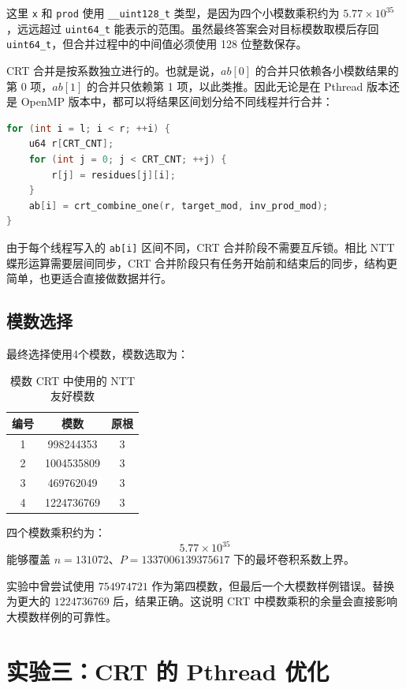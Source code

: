 \documentclass[a4paper]{article}
\begin{document}
这里 \texttt{x} 和 \texttt{prod} 使用 \texttt{\_\_uint128\_t} 类型，是因为四个小模数乘积约为 $5.77\times 10^{35}$，远远超过 \texttt{uint64\_t} 能表示的范围。虽然最终答案会对目标模数取模后存回 \texttt{uint64\_t}，但合并过程中的中间值必须使用 128 位整数保存。

CRT 合并是按系数独立进行的。也就是说，$ab[0]$ 的合并只依赖各小模数结果的第 0 项，$ab[1]$ 的合并只依赖第 1 项，以此类推。因此无论是在 Pthread 版本还是 OpenMP 版本中，都可以将结果区间划分给不同线程并行合并：

\begin{lstlisting}[title=按输出系数并行进行 CRT 合并,frame=trbl,language={C++}]
for (int i = l; i < r; ++i) {
    u64 r[CRT_CNT];
    for (int j = 0; j < CRT_CNT; ++j) {
        r[j] = residues[j][i];
    }
    ab[i] = crt_combine_one(r, target_mod, inv_prod_mod);
}
\end{lstlisting}

由于每个线程写入的 \texttt{ab[i]} 区间不同，CRT 合并阶段不需要互斥锁。相比 NTT 蝶形运算需要层间同步，CRT 合并阶段只有任务开始前和结束后的同步，结构更简单，也更适合直接做数据并行。


\subsection{模数选择}

最终选择使用4个模数，模数选取为：

\begin{table}[htbp]
  \centering
  \caption{模数 CRT 中使用的 NTT 友好模数}
  \label{tab:crt_mods}
  \begin{tabular}{c c c}
    \toprule
    编号 & 模数 & 原根 \\
    \midrule
    1 & 998244353 & 3 \\
    2 & 1004535809 & 3 \\
    3 & 469762049 & 3 \\
    4 & 1224736769 & 3 \\
    \bottomrule
  \end{tabular}
\end{table}

四个模数乘积约为：
\[
5.77\times 10^{35}
\]
能够覆盖 $n=131072$、$P=1337006139375617$ 下的最坏卷积系数上界。

实验中曾尝试使用 $754974721$ 作为第四模数，但最后一个大模数样例错误。替换为更大的 $1224736769$ 后，结果正确。这说明 CRT 中模数乘积的余量会直接影响大模数样例的可靠性。

\section{实验三：CRT 的 Pthread 优化}
\end{document}

